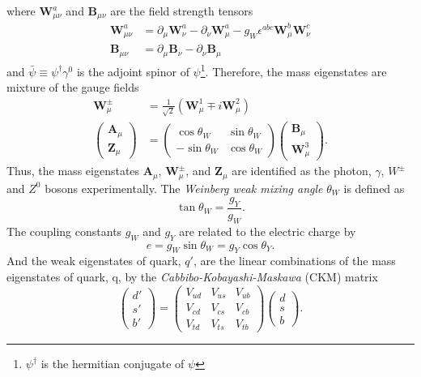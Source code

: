 %
where $\bm{W}_{\mu\nu}^{a}$ and $\bm{B}_{\mu\nu}$ are the field strength tensors
%
\begin{align}
\bm{W}_{\mu\nu}^{a} & = \partial_{\mu} \bm{W}_{\nu}^{a} - \partial_{\nu} \bm{W}_{\mu}^{a} - g_{W} \epsilon^{abc} \bm{W}_{\mu}^{b} \bm{W}_{\nu}^{c}\\
\bm{B}_{\mu\nu} & = \partial_{\mu} \bm{B}_{\nu} - \partial_{\nu} \bm{B}_{\mu}
\label{eq:sm_field_strangth_tensors}
\end{align}
%
and $\bar{\psi} \equiv \psi^{\dagger} \gamma^{0}$ is the adjoint spinor of $\psi$\footnote{$\psi^{\dagger}$ is the hermitian conjugate of $\psi$}.
Therefore, the mass eigenstates are mixture of the gauge fields
%
\begin{align}
\bm{W}_{\mu}^{\pm} & = \frac{1}{\sqrt{2}} (\bm{W}_{\mu}^{1} \mp i \bm{W}_{\mu}^{2})\\
\left(\begin{matrix}\bm{A}_{\mu}\\\bm{Z}_{\mu}\end{matrix}\right) & = \left(\begin{matrix}\cos\theta_{W} & \sin\theta_{W}\\-\sin\theta_{W} & \cos\theta_{W} \end{matrix}\right) \left(\begin{matrix}\bm{B}_{\mu}\\\bm{W}_{\mu}^{3}\end{matrix}\right).
\label{eq:sm_mass_eigenstates}
\end{align}
%
Thus, the mass eigenstates $\bm{A}_{\mu}$, $\bm{W}_{\mu}^{\pm}$, and $\bm{Z}_{\mu}$ are identified as the photon, $\gamma$, $W^{\pm}$ and $Z^{0}$ bosons experimentally.
The \textit{Weinberg weak mixing angle} $\theta_{W}$ is defined as
%
\begin{equation}
\tan \theta_{W} = \frac{g_{Y}}{g_{W}}.
\label{eq:sm_mixing_angle}
\end{equation}
%
The coupling constants $g_{W}$ and $g_{Y}$ are related to the electric charge by
%
\begin{equation}
e = g_{W} \sin\theta_{W} = g_{Y} \cos\theta_{Y}.
\label{eq:sm_coupling_constants}
\end{equation}
%
And the weak eigenstates of quark, $q'$, are the linear combinations of the mass eigenstates of quark, q, by the \textit{Cabbibo-Kobayashi-Maskawa} (CKM) matrix~\cite{PTP.49.652}
%
\begin{equation}
\left(\begin{matrix}d'\\s'\\b'\end{matrix}\right) = \left(\begin{matrix}V_{ud} & V_{us} & V_{ub}\\V_{cd} & V_{cs} & V_{cb}\\V_{td} & V_{ts} &V_{tb}\end{matrix}\right) \left(\begin{matrix}d\\s\\b\end{matrix}\right).
\label{eq:sm_CKM_matrix}
\end{equation}
